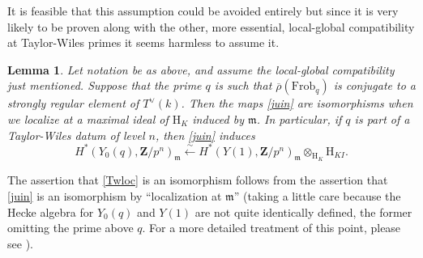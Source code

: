 \documentclass[10pt]{amsart}
\newcommand{\changecolor}{black}
\newcommand{\Z}{\mathbf{Z}}
\newcommand{\rhobar}{\overline{\rho}}
\newtheorem{lemma}[subsection]{Lemma}
\theoremstyle{remark}
\begin{document}
It is feasible that this assumption could be avoided entirely but since it is very likely to be proven along with the other, more essential,
local-global compatibility at Taylor-Wiles primes it seems harmless to assume it. 
 
 \begin{lemma}  \label{needaref}
 Let notation be as above,
and assume the local-global compatibility just mentioned. 
 {\color{\changecolor} Suppose that the prime $q$ is such that $\rhobar(\mathrm{Frob}_q)$ is conjugate
 to a strongly regular element of $T^{\vee}(k)$.}
Then the maps \eqref{juin} are   isomorphisms when  we localize
at a maximal ideal of $\mathrm{H}_K$ induced by $\mathfrak{m}$. 
In particular, if $q$ is part of a Taylor-Wiles datum of level $n$, then \eqref{juin} induces 
\begin{equation} \label{Twloc} H^*(Y_0(q), \Z/p^n)_{\mathfrak{m}}  \stackrel{\sim}{\longleftarrow} H^*(Y(1), \Z/p^n)_{\mathfrak{m}} \otimes_{\mathrm{H}_K} \mathrm{H}_{KI}.\end{equation}
  \end{lemma}
  
 
 

 
\proof 
The assertion that  \eqref{Twloc} is an isomorphism follows from the assertion that \eqref{juin} is an isomorphism by  ``localization at $\mathfrak{m}$'' (taking a little care because the Hecke algebra for $Y_0(q)$ and $Y(1)$ 
are not quite identically defined, the former omitting the prime above $q$. For a more detailed treatment of this point, please see \cite[Lemma 6.20]{KT}).   

 
\end{document}
